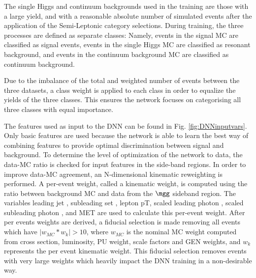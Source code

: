 The single Higgs and continuum backgrounds used in the training are those with a large yield, and with a reasonable absolute number of simulated events after the application of the Semi-Leptonic
category selections. During training, the three processes are defined as separate classes: Namely, events in the signal MC are classified as signal events, events in the single Higgs MC are classified 
as resonant background, and events in the continuum background MC are classified as continuum background. 

Due to the imbalance of the total and weighted number of events between the three datasets, 
a class weight is applied to each class in order to equalize the yields of the three classes. This ensures the network focuses on categorising all three classes with equal importance.

The features used as input to the DNN can be found in Fig. \ref{fig:DNNinputvars}.  Only basic features are used because the network is able
to learn the best way of combining features to provide optimal discrimination between signal and background.
To determine the level of optimization of the network to data, the data-MC ratio is checked for input features in the side-band regions. In order to improve data-MC agreement,
an N-dimensional kinematic reweighting is performed. A per-event weight, called a kinematic weight, is computed using the ratio between background MC and data from the $\mgg$ sideband region. 
The variables leading jet \pt, subleading set \pt, lepton pT, scaled leading photon \pt, scaled subleading photon \pt, and MET are used to calculate this per-event weight. After per events weights
are derived, a fiducial selection is made removing all events which have $|w_{MC}*w_{k}| > 10$, where $w_{MC}$ is the nominal MC weight computed from cross section, luminosity, PU weight,
scale factors and GEN weights, and $w_{k}$ represents the per event kinematic weight. This fiducial selection removes events with very large weights which heavily impact the DNN training in
a non-desirable way.


